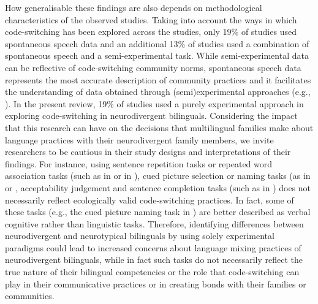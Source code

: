 \documentclass[output=paper]{langscibook}
\begin{document}
How generalisable these findings are also depends on methodological characteristics of the observed studies. Taking into account the ways in which code-switching has been explored across the studies, only 19\% of studies used spontaneous speech data and an additional 13\% of studies used a combination of spontaneous speech and a semi-experimental task. While semi-experimental data can be reflective of code-switching community norms, spontaneous speech data represents the most accurate description of community practices and it facilitates the understanding of data obtained through (semi)experimental approaches (e.g.,  \citealt{vanOschEtAl2023, ParafitaCoutoEtAl2024, Vaughan-EvansEtAl2020}). In the present review, 19\% of studies used a purely experimental approach in exploring code-switching in neurodivergent bilinguals. Considering the impact that this research can have on the decisions that multilingual families make about language practices with their neurodivergent family members, we invite researchers to be cautious in their study designs and interpretations of their findings. For instance, using sentence repetition tasks or repeated word association tasks (such as in \citealt{SoesmanEtAl2022} or in \citealt{ShengEtAl2012}), cued picture selection or naming tasks (as in \citealt{KingEtAl2021} or \citealt{SnijdersEtAl2025}, acceptability judgement and sentence completion tasks (such as in \citealt{LicerasGarcia-Alcaraz2019}) does not necessarily reflect ecologically valid code-switching practices. In fact, some of these tasks (e.g., the cued picture naming task in \citealt{SnijdersEtAl2025}) are better described as verbal cognitive rather than linguistic tasks. Therefore, identifying differences between neurodivergent and neurotypical bilinguals by using solely experimental paradigms could lead to increased concerns about language mixing practices of neurodivergent bilinguals, while in fact such tasks do not necessarily reflect the true nature of their bilingual competencies or the role that code-switching can play in their communicative practices or in creating bonds with their families or communities.
\end{document}
